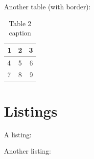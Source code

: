 Another table (with border):
\begin{table}[H]
    \centering
    \begin{tabular}{ | l | c | r | }\hline
        1 & 2 & 3 \\\hline
        4 & 5 & 6 \\\hline
        7 & 8 & 9 \\\hline
    \end{tabular}
    \caption{Table 2 caption}\label{tables_table2}
\end{table}

\section{Listings}

A listing:

Another listing:
